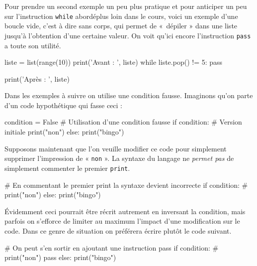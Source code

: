 \vspace{2pt}%

Pour prendre un second exemple un peu plus pratique et pour anticiper un peu sur l'instruction \texttt{while} abordéplus loin dans le cours, voici un exemple d'une boucle vide, c'est à dire sans corps, qui permet de «~dépiler » dans une liste jusqu'à l'obtention d'une certaine valeur. On voit qu'ici encore l'instruction \texttt{pass} a toute son utilité.

\begin{idleconsole}
\begin{pyconsole}
liste = list(range(10))
print('Avant : ', liste)
while liste.pop() != 5:
    pass

print('Après : ', liste)
\end{pyconsole}
\end{idleconsole}

Dans les exemples à suivre on utilise une condition fausse. Imaginons qu'on parte d'un code hypothétique qui fasse ceci :

\begin{idleconsole}
\begin{pyconsole}
condition = False # Utilisation d'une condition fausse
if condition: # Version initiale
    print("non")
else:
    print("bingo")

\end{pyconsole}
\end{idleconsole}

Supposons maintenant que l'on veuille modifier ce code pour simplement supprimer l'impression de « \texttt{non} ». La syntaxe du langage ne \emph{permet pas} de simplement commenter le premier \texttt{print}.

\begin{idleconsole}
\begin{pyconsole}
# En commentant le premier print la syntaxe devient incorrecte
if condition: 
#    print("non")
else:
    print("bingo")

\end{pyconsole}
\end{idleconsole}

Évidemment ceci pourrait être récrit autrement en inversant la con\-dition, mais parfois on s'efforce de limiter au maximum l'impact d'une modification sur le code. Dans ce genre de situation on préférera écrire plutôt le code suivant.

\begin{idleconsole}
\begin{pyconsole}
# On peut s'en sortir en ajoutant une instruction pass
if condition: 
#    print("non")
    pass
else:
    print("bingo")

\end{pyconsole}
\end{idleconsole}

